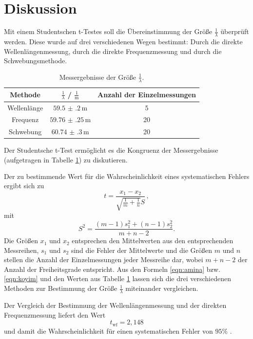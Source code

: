 \section{Diskussion}
\label{sec:Diskussion}
Mit einem Studentschen t-Testes soll die Übereinstimmung der Größe $\frac{1}{\lambda}$
überprüft werden. Diese wurde auf drei verschiedenen Wegen bestimmt: Durch die direkte
Wellenlängenmessung, durch die direkte Frequenzmessung und durch die Schwebungsmethode.

\begin{table}
	\centering
	\caption{Messergebnisse der Größe $\frac{1}{\lambda}$.}
	\label{tab:alam}
	\begin{tabular}{ccc}
		\toprule
		Methode      & $\frac{1}{\lambda}$ / $\frac{1}{\si{\meter}}$ & Anzahl der Einzelmessungen \\
		\midrule
		Wellenlänge & $\num{59.5(2)} \, \si{\meter}$                & 5                          \\
		Frequenz     & $\num{59.76(25)} \, \si{\meter}$              & 20                         \\
		Schwebung    & $\num{60.74(30)} \, \si{\meter}$              & 20                         \\
		\bottomrule
	\end{tabular}
\end{table}
Der Studentsche t-Test ermöglicht es die Kongruenz der Messergebnisse (aufgetragen in Tabelle
\ref{tab:alam}) zu diskutieren.

Der zu bestimmende Wert \cite{ttest} für die  Wahrscheinlichkeit eines systematischen Fehlers
ergibt sich zu
\begin{equation}
	\label{eqn:amina}
	t = \frac{x_1 - x_2}{\sqrt{\frac{1}{m} + \frac{1}{n}} S} \, \mathrm{,}
\end{equation}
mit
\begin{equation}
	\label{eqn:koyim}
	S^2 = \frac{(m-1)s_1^2 + (n-1)s_2^2}{m+n-2} \mathrm{.}
\end{equation}
Die Größen $x_1$ und $x_2$ entsprechen den Mittelwerten aus den entsprechenden Messreihen,
$s_1$ und $s_2$ sind die Fehler der Mittelwerte und die Größen $m$ und $n$ stellen die
Anzahl der Einzelmessungen jeder Messreihe dar, wobei $m+n-2$ der Anzahl der Freiheitsgrade
entspricht.
Aus den Formeln \eqref{eqn:amina} bzw. \eqref{eqn:koyim} und den Werten aus Tabelle
\ref{tab:alam} lassen sich die drei verschiedenen Methoden zur Bestimmung der Größe
$\frac{1}{\lambda}$ miteinander vergleichen.

Der Vergleich der Bestimmung der Wellenlängenmessung und der direkten Frequenzmessung liefert
den Wert
\begin{equation*}
	t_{\mathrm{wf}} = 2,148
\end{equation*}
und damit die Wahrscheinlichkeit für einen systematischen Fehler von $95\%$ \cite{tttest}.


